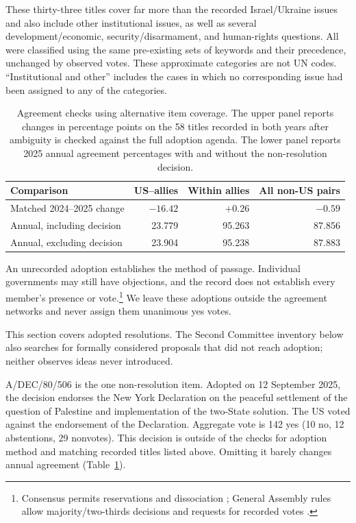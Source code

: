\documentclass[10pt,authoryear]{elsarticle}
\begin{document}
These thirty-three titles cover far more than the recorded Israel/Ukraine issues and also include other institutional issues, as well as several development/economic, security/disarmament, and human-rights questions. All were classified using the same pre-existing sets of keywords and their precedence, unchanged by observed votes. These approximate categories are not UN codes. “Institutional and other” includes the cases in which no corresponding issue had been assigned to any of the categories.

\begin{table}[htbp]
\centering\small
\caption{Agreement checks using alternative item coverage. The upper panel reports changes in percentage points on the 58 titles recorded in both years after ambiguity is checked against the full adoption agenda. The lower panel reports 2025 annual agreement percentages with and without the non-resolution decision.}
\label{tab:adoption_agreement_checks}
\begin{tabular}{lrrr}\toprule
Comparison & US--allies & Within allies & All non-US pairs\\\midrule
Matched 2024--2025 change & $-16.42$ & $+0.26$ & $-0.59$\\\midrule
Annual, including decision & 23.779 & 95.263 & 87.856\\
Annual, excluding decision & 23.904 & 95.238 & 87.883\\\bottomrule
\end{tabular}
\end{table}

An unrecorded adoption establishes the method of passage. Individual governments may still have objections, and the record does not establish every member's presence or vote.\footnote{Consensus permits reservations and dissociation \citep{un:cpc:consensus}; General Assembly rules allow majority/two-thirds decisions and requests for recorded votes \citep{un:ga:rules}.} We leave these adoptions outside the agreement networks and never assign them unanimous yes votes.

This section covers adopted resolutions. The Second Committee inventory below also searches for formally considered proposals that did not reach adoption; neither observes ideas never introduced.

A/DEC/80/506 is the one non-resolution item. Adopted on 12 September 2025, the decision endorses the New York Declaration on the peaceful settlement of the question of Palestine and implementation of the two-State solution. The US voted against the endorsement of the Declaration. Aggregate vote is 142 yes (10 no, 12 abstentions, 29 nonvotes). This decision is outside of the checks for adoption method and matching recorded titles listed above. Omitting it barely changes annual agreement (Table~\ref{tab:adoption_agreement_checks}).
\end{document}
